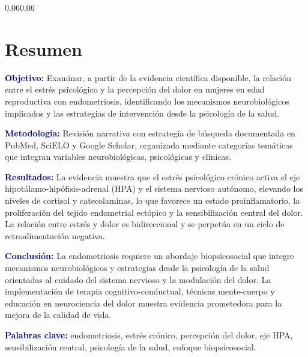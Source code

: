 \documentclass[12pt, a4paper]{article}
\newcommand{\kw}[1]{\textbf{\textcolor{darkblue}{#1}}}
\begin{document}
\begin{adjustwidth}{0.06\textwidth}{0.06\textwidth}

\section*{Resumen}

\begin{mdframed}[style=resumen]
\noindent
\kw{Objetivo:} Examinar, a partir de la evidencia científica disponible, la relación
entre el estrés psicológico y la percepción del dolor en mujeres en edad reproductiva
con endometriosis, identificando los mecanismos neurobiológicos implicados y las
estrategias de intervención desde la psicología de la salud.

\vspace{0.5em}
\kw{Metodología:} Revisión narrativa con estrategia de búsqueda documentada en
PubMed, SciELO y Google Scholar, organizada mediante categorías temáticas que integran
variables neurobiológicas, psicológicas y clínicas.

\vspace{0.5em}
\kw{Resultados:} La evidencia muestra que el estrés psicológico crónico activa el eje
hipotálamo-hipófisis-adrenal (HPA) y el sistema nervioso autónomo, elevando los niveles
de cortisol y catecolaminas, lo que favorece un estado proinflamatorio, la proliferación
del tejido endometrial ectópico y la sensibilización central del dolor. La relación entre
estrés y dolor es bidireccional y se perpetúa en un ciclo de retroalimentación negativa.

\vspace{0.5em}
\kw{Conclusión:} La endometriosis requiere un abordaje biopsicosocial que integre
mecanismos neurobiológicos y estrategias desde la psicología de la salud orientadas al
cuidado del sistema nervioso y la modulación del dolor. La implementación de terapia
cognitivo-conductual, técnicas mente-cuerpo y educación en neurociencia del dolor muestra
evidencia prometedora para la mejora de la calidad de vida.

\vspace{0.8em}
\noindent\kw{Palabras clave:} endometriosis, estrés crónico, percepción del dolor, eje HPA,
sensibilización central, psicología de la salud, enfoque biopsicosocial.
\end{mdframed}


\end{adjustwidth}
\end{document}

